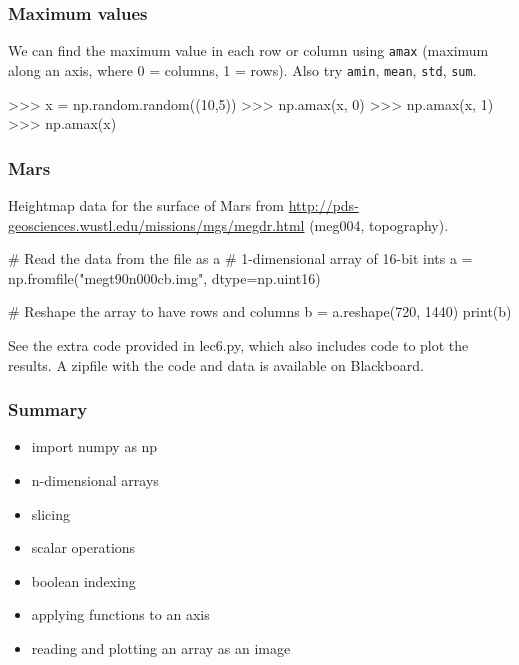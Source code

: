 \documentclass{beamer}
\begin{document}
\begin{frame}[fragile]
\frametitle{Maximum values}
We can find the maximum value in each row or column using \texttt{amax}
(maximum along an axis, where 0 = columns, 1 = rows). Also
try \texttt{amin}, \texttt{mean}, \texttt{std}, \texttt{sum}.
\begin{code}
>>> x = np.random.random((10,5))
>>> np.amax(x, 0)
>>> np.amax(x, 1)
>>> np.amax(x)
\end{code}
\end{frame}

\begin{frame}[fragile]
\frametitle{Mars}
Heightmap data for the surface of Mars from
\url{http://pds-geosciences.wustl.edu/missions/mgs/megdr.html} (meg004,
topography).
\pause
\begin{code}
# Read the data from the file as a 
# 1-dimensional array of 16-bit ints
a = np.fromfile("megt90n000cb.img", dtype=np.uint16)

# Reshape the array to have rows and columns
b = a.reshape(720, 1440)
print(b)
\end{code}
See the extra code provided in lec6.py, which also includes code to plot the
results. A zipfile with the code and data is available on Blackboard. 
\end{frame}

\begin{frame}[fragile]
\frametitle{Summary}
\begin{itemize}
\item import numpy as np
\item n-dimensional arrays
\item slicing
\item scalar operations
\item boolean indexing
\item applying functions to an axis 
\item reading and plotting an array as an image
\end{itemize}
\end{frame}
\end{document}

